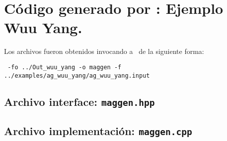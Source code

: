 \section{Código generado por \maggen: Ejemplo Wuu Yang.}
\label{append:agwuuyangcode}

Los archivos fueron obtenidos invocando a \maggen\ de la siguiente forma:

\begin{center}
\footnotesize
\texttt{\maggen\ -fo ../Out\_wuu\_yang -o maggen -f  ../examples/ag\_wuu\_yang/ag\_wuu\_yang.input}
\end{center}


\subsection*{Archivo interface: \texttt{maggen.hpp}}



\subsection*{Archivo implementación: \texttt{maggen.cpp}}



\normalsize